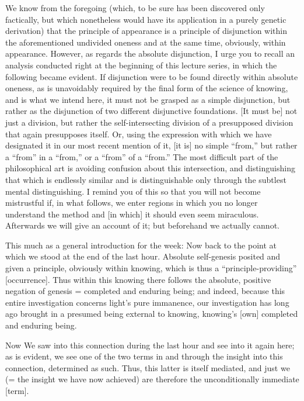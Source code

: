 We know from the foregoing
(which, to be sure has been discovered only factically,
but which nonetheless would have its application
in a purely genetic derivation)
that the principle of appearance is
a principle of disjunction
within the aforementioned undivided oneness
and at the same time, obviously, within appearance.
However, as regards the absolute disjunction,
I urge you to recall an analysis conducted right at
the beginning of this lecture series,
in which the following became evident.
If disjunction were to be found
directly within absolute oneness,
as is unavoidably required by
the final form of the science of knowing,
and is what we intend here,
it must not be grasped as a simple disjunction,
but rather as the disjunction of
two different disjunctive foundations.
[It must be] not just a division,
but rather the self-intersecting division
of a presupposed division
that again presupposes itself.
Or, using the expression with which we have designated it
in our most recent mention of it,
[it is] no simple “from,”
but rather a “from” in a “from,”
or a “from” of a “from.”
The most difficult part of the philosophical art is
avoiding confusion about this intersection,
and distinguishing that which is endlessly similar
and is distinguishable only through
the subtlest mental distinguishing.
I remind you of this so that you will not become mistrustful
if, in what follows, we enter regions
in which you no longer understand the method
and [in which] it should even seem miraculous.
Afterwards we will give an account of it;
but beforehand we actually cannot.

This much as a general introduction for the week:
Now back to the point at which we stood at the end of the last hour.
Absolute self-genesis posited and given a principle,
obviously within knowing,
which is thus a “principle-providing” [occurrence].
Thus within this knowing there follows
the absolute, positive negation of genesis =
completed and enduring being;
and indeed, because this entire investigation
concerns light's pure immanence,
our investigation has long ago brought in
a presumed being external to knowing,
knowing's [own] completed and enduring being.

Now We saw into this connection during the last hour
and see into it again here;
as is evident, we see one of the two terms
in and through the insight into this connection,
determined as such.
Thus, this latter is itself mediated,
and just we (= the insight we have now achieved) are
therefore the unconditionally immediate [term].

